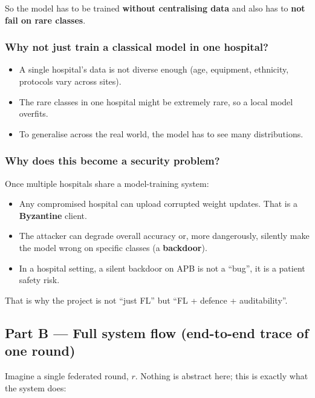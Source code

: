 \documentclass[11pt,a4paper]{article}
\begin{document}
So the model has to be trained \textbf{without centralising data}
and also has to \textbf{not fail on rare classes}.

\subsubsection{Why not just train a classical model in one hospital?}
\begin{itemize}
\item A single hospital's data is not diverse enough (age, equipment, ethnicity, protocols vary across sites).
\item The rare classes in one hospital might be extremely rare, so a local model overfits.
\item To generalise across the real world, the model has to see many distributions.
\end{itemize}

\subsubsection{Why does this become a security problem?}
Once multiple hospitals share a model-training system:
\begin{itemize}
\item Any compromised hospital can upload corrupted weight updates. That is a \textbf{Byzantine} client.
\item The attacker can degrade overall accuracy or, more dangerously, silently make the model wrong on specific classes (a \textbf{backdoor}).
\item In a hospital setting, a silent backdoor on APB is not a ``bug'', it is a patient safety risk.
\end{itemize}

That is why the project is not ``just FL'' but ``FL + defence + auditability''.

\subsection{Part B --- Full system flow (end-to-end trace of one round)}

Imagine a single federated round, $r$. Nothing is abstract here; this is exactly what the system does:
\end{document}
